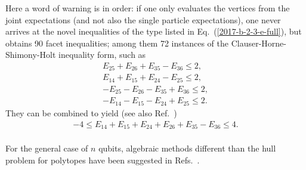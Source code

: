 \documentclass[%
  twocolumn,
 showpacs,
 showkeys,
 preprintnumbers,
 amsmath,amssymb,
 aps,
  pra,
  longbibliography,
 floatfix,
 ]{revtex4-1}
\begin{document}
%
%
%
%

Here a word of warning is in order: if one only evaluates the vertices from the joint expectations (and not also the single particle expectations),
one never arrives at the novel inequalities of the type listed in Eq.~(\ref{2017-b-2-3-e-full}),
but obtains
90 facet inequalities; among them 72
instances  of the Clauser-Horne-Shimony-Holt inequality form, such as
\begin{equation}
\begin{split}
   E_{25} +E_{26}    +E_{35}  -E_{36}  \le   2,            \\
 E_{14} +E_{15}    +E_{24}  -E_{25}          \le      2,      \\
  -E_{25} -E_{26}    -E_{35}  +E_{36}  \le   2,           \\
 -E_{14} -E_{15}    -E_{24}  +E_{25}          \le      2.
\end{split}
\label{2017-b-2-3-e}
\end{equation}
They can be combined to yield  (see also Ref.~\cite[p.~166, Eq.~(4)]{sliwa-2003})
\begin{equation}
\begin{split}
-4 \le   E_{14} + E_{15}    + E_{24}   + E_{26}    + E_{35}  - E_{36}  \le   4.            \\
\end{split}
\label{2017-b-2-3-enovel}
\end{equation}


For the general case of $n$ qubits, algebraic methods
different than the hull problem for polytopes have been suggested in Refs.~\cite{Werner-2001,Zukowski-02,Pitowsky-2002mbo,schachner-2003}.
\end{document}
